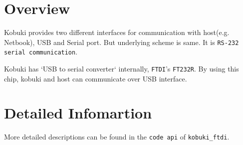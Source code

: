 \section{\-Overview}\label{enFtdiGuide_ftdiOverview}
\-Kobuki provides two different interfaces for communication with host(e.\-g. \-Netbook), \-U\-S\-B and \-Serial port. \-But underlying scheme is same. \-It is {\tt \-R\-S-\/232} {\tt serial communication}.

\-Kobuki has `\-U\-S\-B to serial converter` internally, {\tt \-F\-T\-D\-I}'s {\tt \-F\-T232\-R}. \-By using this chip, kobuki and host can communicate over \-U\-S\-B interface.\section{\-Detailed Infomartion}\label{enFtdiGuide_ftdiDetailedInformation}
\-More detailed descriptions can be found in the {\tt code api} of {\tt kobuki\-\_\-ftdi}. 